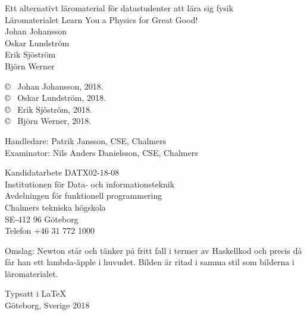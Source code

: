 \newpage
\thispagestyle{plain}
\vspace*{0cm}
Ett alternativt läromaterial för datastudenter att lära sig fysik\\
Läromaterialet Learn You a Physics for Great Good!\\
Johan Johansson \\
Oskar Lundström \\
Erik Sjöström \\
Björn Werner
\setlength{\parskip}{1cm}

\copyright ~ Johan Johansson, 2018. \setlength{\parskip}{1cm} \\
\copyright ~ Oskar Lundström, 2018. \setlength{\parskip}{1cm} \\
\copyright ~ Erik Sjöström, 2018. \setlength{\parskip}{1cm} \\
\copyright ~ Björn Werner, 2018. \setlength{\parskip}{1cm}

Handledare: Patrik Jansson, CSE, Chalmers\\
Examinator: Nils Anders Danielsson, CSE, Chalmers \setlength{\parskip}{1cm}

Kandidatarbete DATX02-18-08 \\
Institutionen för Data- och informationsteknik \\
Avdelningen för funktionell programmering\\
Chalmers tekniska högskola\\
SE-412 96 Göteborg\\
Telefon +46 31 772 1000
\setlength{\parskip}{0.5cm}%

\vfill
Omslag: Newton står och tänker på fritt fall i termer av Haskellkod och precis då får han ett lambda-äpple i huvudet. Bilden är ritad i samma stil som bilderna i läromaterialet.

Typsatt i \LaTeX \\
Göteborg, Sverige 2018
